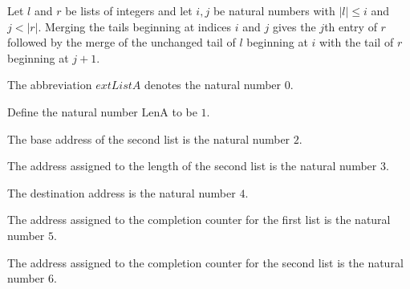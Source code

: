 \begin{theorem}
\label{Light.Merge.step_right_end}
\leanok
{}
Let $l$ and $r$ be lists of integers and let $i,j$ be natural numbers with $|l|\le i$
and $j<|r|$. Merging the tails beginning at indices $i$ and $j$ gives the $j$th entry of
$r$ followed by the merge of the unchanged tail of $l$ beginning at $i$ with the tail of
$r$ beginning at $j+1$.
\end{theorem}

\begin{definition}
\label{Light.Merge.ListA}
\leanok
The abbreviation $	ext{ListA}$ denotes the natural number $0$.
\end{definition}

\begin{definition}
\label{Light.Merge.LenA}
\leanok
{}
Define the natural number $\mathrm{LenA}$ to be $1$.
\end{definition}

\begin{definition}
\label{Light.Merge.ListB}
\leanok
{}
The base address of the second list is the natural number $2$.
\end{definition}

\begin{definition}
\label{Light.Merge.LenB}
\leanok
{}
The address assigned to the length of the second list is the natural number $3$.
\end{definition}

\begin{definition}
\label{Light.Merge.Dest}
\leanok
{}
The destination address is the natural number $4$.
\end{definition}

\begin{definition}
\label{Light.Merge.DoneA}
\leanok
{}
The address assigned to the completion counter for the first list is the natural number
$5$.
\end{definition}

\begin{definition}
\label{Light.Merge.DoneB}
\leanok
{}
The address assigned to the completion counter for the second list is the natural number
$6$.
\end{definition}

